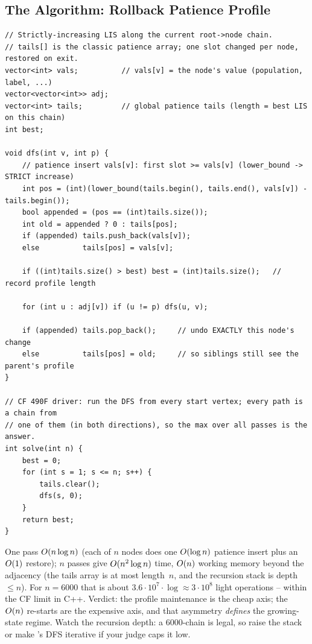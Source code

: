 \subsection{The Algorithm: Rollback Patience Profile}

\begin{lstlisting}[caption={A single rollback patience profile maintained through a DFS: extend on entry, undo the exact change on exit}, label={lst:c27-profile}]
// Strictly-increasing LIS along the current root->node chain.
// tails[] is the classic patience array; one slot changed per node, restored on exit.
vector<int> vals;          // vals[v] = the node's value (population, label, ...)
vector<vector<int>> adj;
vector<int> tails;         // global patience tails (length = best LIS on this chain)
int best;

void dfs(int v, int p) {
    // patience insert vals[v]: first slot >= vals[v] (lower_bound -> STRICT increase)
    int pos = (int)(lower_bound(tails.begin(), tails.end(), vals[v]) - tails.begin());
    bool appended = (pos == (int)tails.size());
    int old = appended ? 0 : tails[pos];
    if (appended) tails.push_back(vals[v]);
    else          tails[pos] = vals[v];

    if ((int)tails.size() > best) best = (int)tails.size();   // record profile length

    for (int u : adj[v]) if (u != p) dfs(u, v);

    if (appended) tails.pop_back();     // undo EXACTLY this node's change
    else          tails[pos] = old;     // so siblings still see the parent's profile
}

// CF 490F driver: run the DFS from every start vertex; every path is a chain from
// one of them (in both directions), so the max over all passes is the answer.
int solve(int n) {
    best = 0;
    for (int s = 1; s <= n; s++) {
        tails.clear();
        dfs(s, 0);
    }
    return best;
}
\end{lstlisting}

\begin{complexitybox}
One pass $O(n\log n)$ (each of $n$ nodes does one $O(\log n)$ patience insert
plus an $O(1)$ restore); $n$ passes give $O(n^2 \log n)$ time,
$O(n)$ working memory beyond the adjacency (the tails array is at most length~$n$,
and the recursion stack is depth $\le n$). For $n = 6000$ that is about
$3.6\cdot10^{7}\!\cdot\!\log \approx 3\cdot10^{8}$ light operations -- within the CF
limit in C++. Verdict: the profile maintenance is the cheap axis; the $O(n)$
re-starts are the expensive axis, and that asymmetry \emph{defines} the growing-state
regime. Watch the recursion depth: a $6000$-chain is legal, so raise the stack or
make 's DFS iterative if your judge caps it low.
\end{complexitybox}

